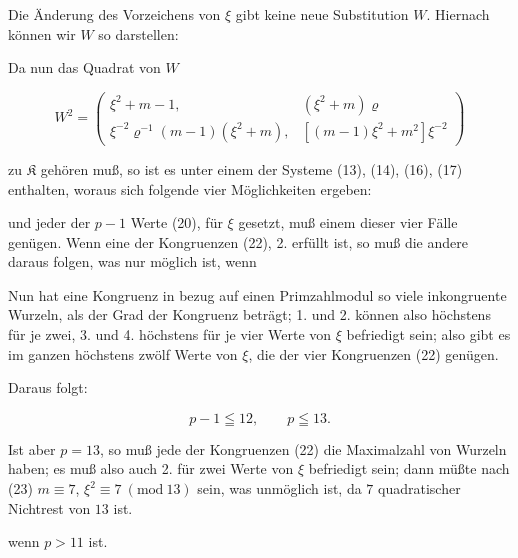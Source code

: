 
 Die Änderung des Vorzeichens von $\xi$ gibt keine neue Substitution $W$. Hiernach können wir $W$ so darstellen:


Da nun das Quadrat von $W$

\[ W^2=\begin{pmatrix}\xi^2+m-1, & (\xi^2+m)\varrho\\ \xi^{-2}\varrho^{-1}(m-1)(\xi^2+m), & [(m-1)\xi^2+m^2]\xi^{-2}\end{pmatrix} \]

zu $\mathfrak{K}$ gehören muß, so ist es unter einem der Systeme (13), (14), (16), (17) enthalten, woraus sich folgende vier Möglichkeiten ergeben:


und jeder der $p-1$ Werte (20), für $\xi$ gesetzt, muß einem dieser vier Fälle genügen. Wenn eine der Kongruenzen (22), 2. erfüllt ist, so muß die andere daraus folgen, was nur möglich ist, wenn


Nun hat eine Kongruenz in bezug auf einen Primzahlmodul  so viele inkongruente Wurzeln, als der Grad der Kongruenz beträgt; 1. und 2. können also höchstens für je zwei, 3. und 4. höchstens für je vier Werte von $\xi$ befriedigt sein; also gibt es im ganzen höchstens zwölf Werte von $\xi$, die  der vier Kongruenzen (22) genügen.

Daraus folgt:

\[ p-1\leqq 12,\qquad p\leqq 13. \]

Ist aber $p=13$, so muß jede der Kongruenzen (22) die Maximalzahl von Wurzeln haben; es muß also auch 2. für zwei Werte von $\xi$ befriedigt sein; dann müßte nach (23) $m\equiv 7$, $\xi^2\equiv 7\ (\mathrm{mod}\ 13)$ sein, was unmöglich ist, da $7$ quadratischer Nichtrest von $13$ ist.

 wenn $p>11$ ist.
